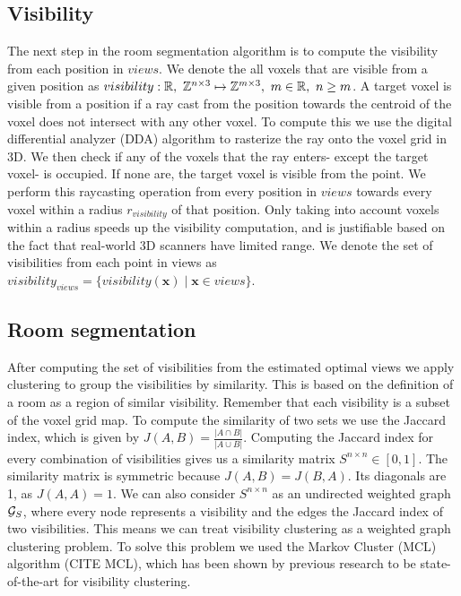 \subsection{Visibility}
The next step in the room segmentation algorithm is to compute the visibility from each position in \(views\). We denote the all voxels that are visible from a given position as \(visibility: \mathbb{R},\ \mathbb{Z}^{n \times 3} \mapsto \mathbb{Z}^{m \times 3},\ m \in \mathbb{R},\ n \geq m\). A target voxel is visible from a position if a ray cast from the position towards the centroid of the voxel does not intersect with any other voxel. To compute this we use the digital differential analyzer (DDA) algorithm to rasterize the ray onto the voxel grid in 3D. We then check if any of the voxels that the ray enters- except the target voxel- is occupied. If none are, the target voxel is visible from the point. We perform this raycasting operation from every position in \(views\) towards every voxel within a radius \(r_{visibility}\) of that position. Only taking into account voxels within a radius speeds up the visibility computation, and is justifiable based on the fact that real-world 3D scanners have limited range. We denote the set of visibilities from each point in views as \(visibility_{views} = \{visibility(\boldsymbol{x}) \mid \boldsymbol{x} \in views\}\).

\subsection{Room segmentation}
After computing the set of visibilities from the estimated optimal views we apply clustering to group the visibilities by similarity. This is based on the definition of a room as a region of similar visibility. Remember that each visibility is a subset of the voxel grid map. To compute the similarity of two sets we use the Jaccard index, which is given by \(J(A,B) = \frac{|A \cap B|}{|A \cup B|}\). Computing the Jaccard index for every combination of visibilities gives us a similarity matrix \(S^{n \times n} \in [0, 1]\). The similarity matrix is symmetric because \(J(A,B) = J(B,A)\). Its diagonals are 1, as \(J(A,A) = 1\). We can also consider \(S^{n \times n}\) as an undirected weighted graph \(\mathcal{G}_S\), where every node represents a visibility and the edges the Jaccard index of two visibilities. This means we can treat visibility clustering as a weighted graph clustering problem. To solve this problem we used the Markov Cluster (MCL) algorithm (CITE MCL), which has been shown by previous research to be state-of-the-art for visibility clustering. 

